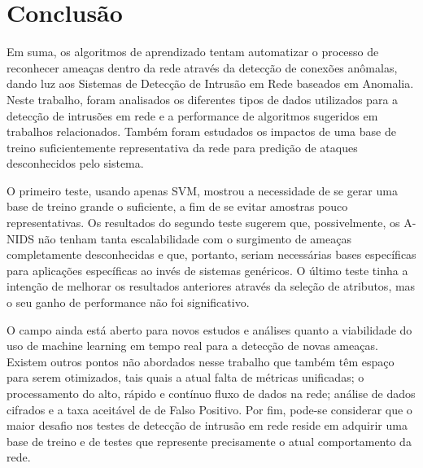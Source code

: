 \chapter{Conclusão}
\label{chap:conclusao}

Em suma, os algoritmos de aprendizado tentam automatizar o processo de reconhecer ameaças dentro da rede
através da detecção de conexões anômalas, dando luz aos Sistemas de Detecção de Intrusão em Rede baseados em Anomalia.
Neste trabalho, foram analisados os diferentes tipos de dados utilizados para a detecção de intrusões em rede e a
performance de algoritmos sugeridos em trabalhos relacionados. Também foram estudados os impactos de uma base de
treino suficientemente representativa da rede para predição de ataques desconhecidos pelo sistema.
\par O primeiro teste, usando apenas SVM, mostrou a necessidade de se gerar uma base de treino grande o suficiente, a
fim de se evitar amostras pouco representativas. Os resultados do segundo teste sugerem que, possivelmente, os A-NIDS
não tenham tanta escalabilidade com o surgimento de ameaças completamente desconhecidas e que, portanto, seriam
necessárias bases específicas para aplicações específicas ao invés de sistemas genéricos. O último teste tinha a
intenção de melhorar os resultados anteriores através da seleção de atributos, mas o seu ganho de performance não foi
significativo.
\par O campo ainda está aberto para novos estudos e análises quanto a viabilidade do uso de machine learning em tempo
real para a detecção de novas ameaças. Existem outros pontos não abordados nesse trabalho que também têm espaço para
serem otimizados, tais quais a atual falta de métricas unificadas; o processamento do alto, rápido e contínuo fluxo de
dados na rede; análise de dados cifrados e a taxa aceitável de de Falso Positivo. Por fim, pode-se considerar que
 o maior desafio nos testes de detecção de intrusão em rede reside em adquirir uma base de treino e de testes que
 represente precisamente o atual comportamento da rede.